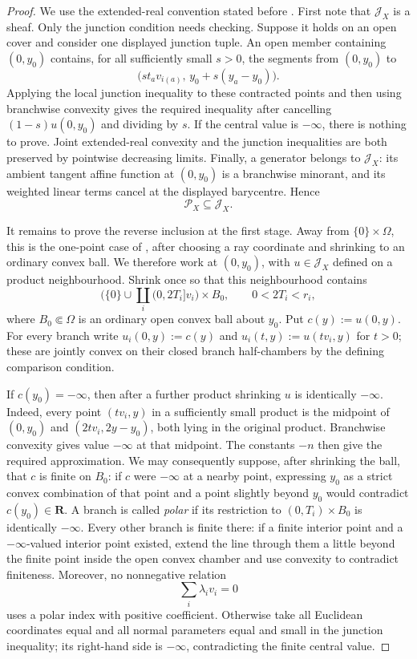 \begin{proof}
We use the extended-real convention stated before
.  First note that
\(\mathcal J_X\) is a sheaf.  Only the junction condition needs checking.
Suppose it holds on an open cover and consider one displayed junction tuple.
An open member containing \((0,y_0)\) contains, for all sufficiently small
\(s>0\), the segments from \((0,y_0)\) to
\[
 \bigl(st_av_{i(a)},\,y_0+s(y_a-y_0)\bigr).
\]
Applying the local junction inequality to these contracted points and then
using branchwise convexity gives the required inequality after cancelling
\((1-s)u(0,y_0)\) and dividing by \(s\).  If the central value is
\(-\infty\), there is nothing to prove.  Joint extended-real convexity and
the junction inequalities are both preserved by pointwise decreasing
limits.  Finally, a generator belongs to \(\mathcal J_X\): its ambient
tangent affine function at \((0,y_0)\) is a branchwise minorant, and its
weighted linear terms cancel at the displayed barycentre.  Hence
\[
                         \mathcal P_X\subseteq\mathcal J_X.
 \tag{\(\dagger\)}
\]

It remains to prove the reverse inclusion at the first stage.  Away from
\(\{0\}\times\Omega\), this is the one-point case of
, after choosing a ray coordinate
and shrinking to an ordinary convex ball.  We therefore work at
\((0,y_0)\), with \(u\in\mathcal J_X\) defined on a product neighbourhood.
Shrink once so that this neighbourhood contains
\[
\bigl(\{0\}\cup\coprod_i(0,2T_i]v_i\bigr)\times B_0,
\qquad 0<2T_i<r_i,
\]
where \(B_0\Subset\Omega\) is an ordinary open convex ball about \(y_0\).
Put \(c(y):=u(0,y)\).
For every branch write \(u_i(0,y):=c(y)\) and
\(u_i(t,y):=u(tv_i,y)\) for \(t>0\); these are jointly convex on their
closed branch half-chambers by the defining comparison condition.

If \(c(y_0)=-\infty\), then after a further product shrinking \(u\) is
identically \(-\infty\).  Indeed, every point \((tv_i,y)\) in a sufficiently
small product is the midpoint of \((0,y_0)\) and
\((2tv_i,2y-y_0)\), both lying in the original product.  Branchwise
convexity gives value \(-\infty\) at that midpoint.  The constants \(-n\)
then give the required approximation.  We may consequently suppose, after
shrinking the ball, that \(c\) is finite on \(B_0\): if \(c\) were
\(-\infty\) at a nearby point, expressing \(y_0\) as a strict convex
combination of that point and a point slightly beyond \(y_0\) would
contradict \(c(y_0)\in\mathbf R\).  A branch is called
\emph{polar} if its restriction to
\((0,T_i)\times B_0\) is identically \(-\infty\).  Every other branch is
finite there: if a finite interior point and a \(-\infty\)-valued interior
point existed,
extend the line through them a little beyond the finite point inside the
open convex chamber and use convexity to contradict finiteness.  Moreover,
no nonnegative relation
\[
                         \sum_i\lambda_iv_i=0
 \tag{\(\ddagger\)}
\]
uses a polar index with positive coefficient.  Otherwise take all Euclidean
coordinates equal and all normal parameters equal and small in the junction
inequality; its right-hand side is \(-\infty\), contradicting the finite
central value.


\end{proof}
